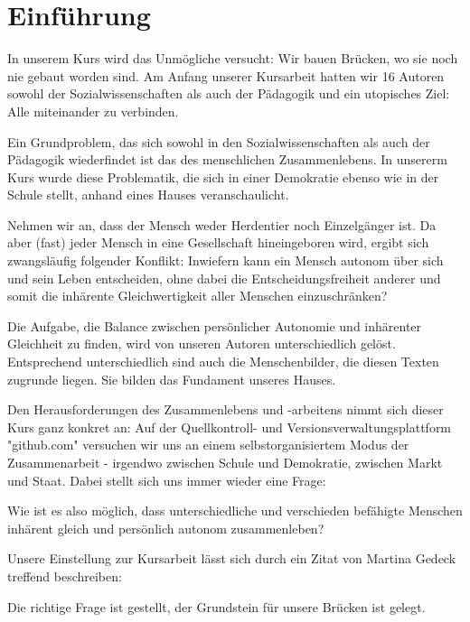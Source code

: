 \section{Einführung}
In unserem Kurs wird das Unmögliche versucht:
Wir bauen Brücken, wo sie noch nie gebaut worden sind.
Am Anfang unserer Kursarbeit hatten wir 16 Autoren sowohl der Sozialwissenschaften als auch der Pädagogik und ein utopisches Ziel: Alle miteinander zu verbinden.

Ein Grundproblem, das sich sowohl in den Sozialwissenschaften als auch der Pädagogik wiederfindet ist das des menschlichen Zusammenlebens.
In unsererm Kurs wurde diese Problematik, die sich in einer Demokratie ebenso wie in der Schule stellt, anhand eines Hauses veranschaulicht.


Nehmen wir an, dass der Mensch weder Herdentier noch Einzelgänger ist.
Da aber (fast) jeder Mensch in eine Gesellschaft hineingeboren wird, ergibt sich zwangsläufig folgender Konflikt:
Inwiefern kann ein Mensch autonom über sich und sein Leben entscheiden, ohne dabei die Entscheidungsfreiheit anderer und somit die inhärente Gleichwertigkeit aller Menschen einzuschränken?

Die Aufgabe, die Balance zwischen persönlicher Autonomie und inhärenter Gleichheit zu finden, wird von unseren Autoren unterschiedlich gelöst.
Entsprechend unterschiedlich sind auch die Menschenbilder, die diesen Texten zugrunde liegen.
Sie bilden das Fundament unseres Hauses.

Den Herausforderungen des Zusammenlebens und -arbeitens nimmt sich dieser Kurs ganz konkret an:
Auf der Quellkontroll- und Versionsverwaltungsplattform "github.com" versuchen wir uns an einem selbstorganisiertem Modus der Zusammenarbeit - irgendwo zwischen Schule und Demokratie, zwischen Markt und Staat.
Dabei stellt sich uns immer wieder eine Frage:

Wie ist es also möglich, dass unterschiedliche und verschieden befähigte Menschen inhärent gleich und persönlich autonom zusammenleben?

Unsere Einstellung zur Kursarbeit lässt sich durch ein Zitat von Martina Gedeck treffend beschreiben:


Die richtige Frage ist gestellt, der Grundstein für unsere Brücken ist gelegt.
